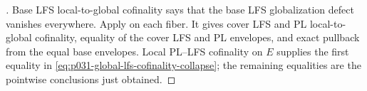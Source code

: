 \begin{proof}[]
Base LFS local-to-global cofinality says that the base LFS globalization
defect vanishes everywhere.  Apply
 on each fiber.  It gives
cover LFS and PL local-to-global cofinality, equality of the cover LFS and
PL envelopes, and exact pullback from the equal base envelopes.  Local
PL--LFS cofinality on $E$ supplies the first equality in
\eqref{eq:p031-global-lfs-cofinality-collapse}; the remaining equalities
are the pointwise conclusions just obtained.
\end{proof}
